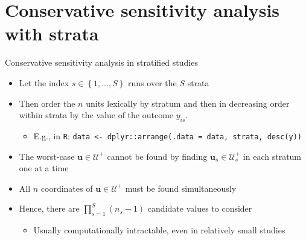 \documentclass[table, xcolor={dvipsnames}, 9pt]{beamer}
\theoremstyle{newstyle}
\begin{document}
\section{Conservative sensitivity analysis with strata}
\begin{frame}{Conservative sensitivity analysis in stratified studies}
\begin{itemize}
\item Let the index $s \in \left\{1, \ldots, S\right\}$ runs over the $S$ strata
\item \pause Then order the $n$ units lexically by stratum and then in decreasing order within strata by the value of the outcome $y_{is}$.
\begin{itemize}
\item \pause E.g., in \texttt{R}: \texttt{data <- dplyr::arrange(.data = data, strata, desc(y))}
\end{itemize}	
\item \pause The worst-case $\mathbf{u} \in \mathcal{U}^+$ cannot be found by finding $\mathbf{u}_s \in \mathcal{U}_s^+$ in each stratum one at a time
\item \pause All $n$ coordinates of $\mathbf{u} \in \mathcal{U}^+$ must be found simultaneously
\item \pause Hence, there are $\prod \limits_{s = 1}^S \left(n_s - 1\right)$ candidate values to consider
\begin{itemize}
\item \pause Usually computationally intractable, even in relatively small studies
\end{itemize}
\end{itemize}
\end{frame}
\end{document}
